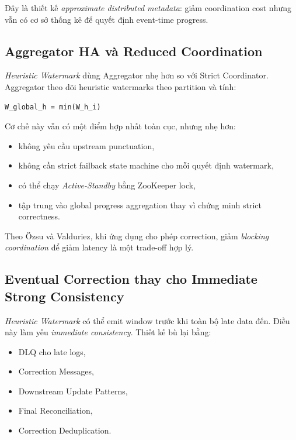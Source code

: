 \documentclass[12pt,a4paper]{article}
\begin{document}
Đây là thiết kế \textit{approximate distributed metadata}: giảm coordination cost nhưng vẫn có cơ sở thống kê để quyết định event-time progress.

\subsection{Aggregator HA và Reduced Coordination}

\textit{Heuristic Watermark} dùng Aggregator nhẹ hơn so với Strict Coordinator. Aggregator theo dõi heuristic watermarks theo partition và tính:

\begin{lstlisting}
W_global_h = min(W_h_i)
\end{lstlisting}

Cơ chế này vẫn có một điểm hợp nhất toàn cục, nhưng nhẹ hơn:

\begin{itemize}
    \item không yêu cầu upstream punctuation,
    \item không cần strict failback state machine cho mỗi quyết định watermark,
    \item có thể chạy \textit{Active-Standby} bằng ZooKeeper lock,
    \item tập trung vào global progress aggregation thay vì chứng minh strict correctness.
\end{itemize}

Theo Özsu và Valduriez, khi ứng dụng cho phép correction, giảm \textit{blocking coordination} để giảm latency là một trade-off hợp lý.

\subsection{Eventual Correction thay cho Immediate Strong Consistency}

\textit{Heuristic Watermark} có thể emit window trước khi toàn bộ late data đến. Điều này làm yếu \textit{immediate consistency}. Thiết kế bù lại bằng:

\begin{itemize}
    \item DLQ cho late logs,
    \item Correction Messages,
    \item Downstream Update Patterns,
    \item Final Reconciliation,
    \item Correction Deduplication.
\end{itemize}
\end{document}
